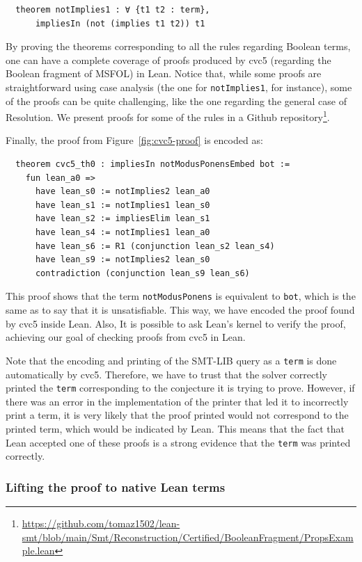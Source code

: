\begin{verbatim}
  theorem notImplies1 : ∀ {t1 t2 : term},
      impliesIn (not (implies t1 t2)) t1
\end{verbatim}

By proving the theorems corresponding to all the rules regarding Boolean terms, one can have a
complete coverage of proofs produced by cvc5 (regarding the Boolean fragment of MSFOL) in Lean.
Notice that, while some proofs are straightforward using case analysis (the one for
\texttt{notImplies1}, for instance),
some of the proofs can be quite challenging, like the one regarding the general
case of Resolution. We present proofs for some of the rules in a Github repository\footnote{\url{https://github.com/tomaz1502/lean-smt/blob/main/Smt/Reconstruction/Certified/BooleanFragment/PropsExample.lean}}.

Finally, the proof from Figure~\ref{fig:cvc5-proof} is encoded as:

\begin{verbatim}
  theorem cvc5_th0 : impliesIn notModusPonensEmbed bot :=
    fun lean_a0 =>
      have lean_s0 := notImplies2 lean_a0
      have lean_s1 := notImplies1 lean_s0
      have lean_s2 := impliesElim lean_s1
      have lean_s4 := notImplies1 lean_a0
      have lean_s6 := R1 (conjunction lean_s2 lean_s4)
      have lean_s9 := notImplies2 lean_s0
      contradiction (conjunction lean_s9 lean_s6)
\end{verbatim}

This proof shows that the term \texttt{notModusPonens} is equivalent to \texttt{bot}, which is
the same as to say that it is unsatisfiable. This way, we have encoded the proof found by cvc5
inside Lean. Also, It is possible to ask Lean's kernel to verify the proof, achieving our
goal of checking proofs from cvc5 in Lean.

Note that the encoding and printing of the SMT-LIB query as a \texttt{term} is done automatically by cvc5.
Therefore, we have to trust
that the solver correctly printed the \texttt{term} corresponding to
the conjecture it is trying to prove. However, if there was an error
in the implementation of the printer that led it to incorrectly
print a term, it is very likely that the proof printed would not
correspond to the printed term, which would be indicated by Lean.
This means that the fact that Lean accepted
one of these proofs is a strong evidence that the \texttt{term} was printed
correctly.

\subsubsection{Lifting the proof to native Lean terms}

